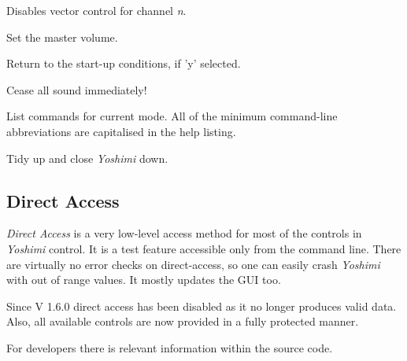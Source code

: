       Disables vector control for channel \textsl{n}.

      Set the master volume.

      Return to the start-up conditions, if 'y' selected.

      Cease all sound immediately!

      List commands for current mode.  All of the minimum command-line
      abbreviations are capitalised in the help listing.

         Tidy up and close \textsl{Yoshimi} down.

\subsection{Direct Access}
\label{subsec:command_line_direct_access}

   \textsl{Direct Access} is a very low-level access method for most of the
   controls in \textsl{Yoshimi} control.
   It is a test feature accessible only from the command line.
   There are virtually no error checks on direct-access, so one can easily
   crash \textsl{Yoshimi} with out of range values.
   It mostly updates the GUI too.

   Since V 1.6.0 direct access has been disabled as it no longer produces
   valid data. Also, all available controls are now provided in a fully
   protected manner.

   For developers there is relevant information within the source code.

